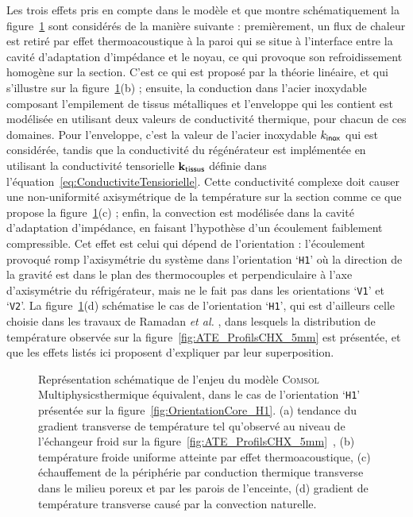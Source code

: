Les trois effets pris en compte dans le modèle et que montre schématiquement la figure~\ref{fig:SuperpositionComsol} sont considérés de la manière suivante : premièrement, un flux de chaleur est retiré par effet thermoacoustique à la paroi qui se situe à l'interface entre la cavité d'adaptation d'impédance et le noyau, ce qui provoque son refroidissement homogène sur la section. C'est ce qui est proposé par la théorie linéaire, et qui s'illustre sur la figure~\ref{fig:SuperpositionComsol}(b) ; ensuite, la conduction dans l'acier inoxydable composant l'empilement de tissus métalliques et l'enveloppe qui les contient est modélisée en utilisant deux valeurs de conductivité thermique, pour chacun de ces domaines. Pour l'enveloppe, c'est la valeur de l'acier inoxydable $k_{\sf inox}$ qui est considérée, tandis que la conductivité du régénérateur est implémentée en utilisant la conductivité tensorielle $\mathbf k_{\sf tissus}$ définie dans l'équation~\eqref{eq:ConductiviteTensiorielle}. Cette conductivité complexe doit causer une non-uniformité axisymétrique de la température sur la section comme ce que propose la figure~\ref{fig:SuperpositionComsol}(c) ; enfin, la convection est modélisée dans la cavité d'adaptation d'impédance, en faisant l'hypothèse d'un écoulement faiblement compressible. Cet effet est celui qui dépend de l'orientation : l'écoulement provoqué romp l'axisymétrie du système dans l'orientation `\texttt{H1}' où la direction de la gravité est dans le plan des thermocouples et perpendiculaire à l'axe d'axisymétrie du réfrigérateur, mais ne le fait pas dans les orientations `\texttt{V1}' et `\texttt{V2}'. La figure~\ref{fig:SuperpositionComsol}(d) schématise le cas de l'orientation `\texttt{H1}', qui est d'ailleurs celle choisie dans les travaux de Ramadan \textit{et al.} \cite{ramadan_design_2021}, dans lesquels la distribution de température observée sur la figure~\ref{fig:ATE_ProfilsCHX_5mm} est présentée, et que les effets listés ici proposent d'expliquer par leur superposition.

\begin{figure}[!ht]
    \centering
    
    \caption{Représentation schématique de l'enjeu du modèle \textsc{Comsol} Multi\-physics\textss\textregistered thermique équivalent, dans le cas de l'orientation `\texttt{H1}' présentée sur la figure~\ref{fig:OrientationCore_H1}. (a) tendance du gradient transverse de température tel qu'observé au niveau de l'échangeur froid sur la figure~\ref{fig:ATE_ProfilsCHX_5mm}~\cite{ramadan_design_2021}, (b) température froide uniforme atteinte par effet thermoacoustique, (c) échauffement de la périphérie par conduction thermique transverse dans le milieu poreux et par les parois de l'enceinte, (d) gradient de température transverse causé par la convection naturelle.}
    \label{fig:SuperpositionComsol}
\end{figure}

